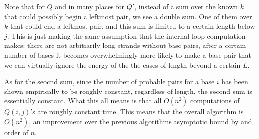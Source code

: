 Note that for $Q$ and in many places for $Q'$, instead of a sum over
the known $k$ that could possibly begin a leftmost pair, we see a
double sum. One of them over $k$ that could end a leftmost pair, and
this sum is limited to a certain length below $j$. This is just making
the same assumption that the internal loop computation makes: there
are not arbitrarily long strands without base pairs, after a certain
number of bases it becomes overwhelmingly more likely to make a base
pair that we can virtually ignore the energy of the the cases of
length beyond a certain $L$.

As for the seocnd sum, since the number of probable pairs for a base
$i$ has been shown empirically to be roughly constant, regardless of
length, the second sum is essentially constant. What this all means is
that all $O(n^2)$ computations of $Q(i,j)$'s are roughly constant
time. This means that the overall algorithm is $O(n^2)$, an
improvement over the previous algorithms asymptotic bound by and order
of $n$.

